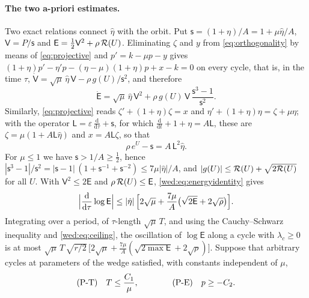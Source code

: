 \paragraph{The two a-priori estimates.}
Two exact relations connect $\hat\eta$ with the orbit. Put $\mathsf s=(1+\eta)/A=1+\mu\hat\eta/A$, $\mathsf V=P/\mathsf s$ and $\mathsf E=\tfrac12\mathsf V^2+\rho\,\mathcal R(U)$. Eliminating $\zeta$ and $y$ from \eqref{eq:orthogonality} by means of \eqref{eq:projective} and $p'=k-\mu p-y$ gives $(1+\eta)p'-\eta'p-(\eta-\mu)(1+\eta)p+x-k=0$ on every cycle, that is, in the time $\tau$, $\dot{\mathsf V}=\sqrt\mu\,\hat\eta\,\mathsf V-\rho\,g(U)/\mathsf s^2$, and therefore
\begin{equation}\label{wed:eq:energyidentity}
\dot{\mathsf E}=\sqrt\mu\,\hat\eta\,\mathsf V^2+\rho\,g(U)\,\mathsf V\,\frac{\mathsf s^3-1}{\mathsf s^2}.
\end{equation}
Similarly, \eqref{eq:projective} reads $\zeta'+(1+\eta)\zeta=x$ and $\eta'+(1+\eta)\eta=\zeta+\mu\eta$; with the operator $\mathsf L=\varepsilon\,\tfrac{\mathrm d}{\mathrm d\tau}+\mathsf s$, for which $\tfrac{\mathrm d}{\mathrm dt}+1+\eta=A\mathsf L$, these are $\zeta=\mu(1+A\mathsf L\hat\eta)$ and $x=A\mathsf L\zeta$, so that
\begin{equation}\label{wed:eq:spike}
\rho\,e^U-\mathsf s=A\,\mathsf L^2\hat\eta .
\end{equation}
For $\mu\le1$ we have $\mathsf s>1/A\ge\tfrac12$, hence $|\mathsf s^3-1|/\mathsf s^2=|\mathsf s-1|\,(1+\mathsf s^{-1}+\mathsf s^{-2})\le7\mu|\hat\eta|/A$, and $|g(U)|\le\mathcal R(U)+\sqrt{2\mathcal R(U)}$ for all $U$. With $\mathsf V^2\le2\mathsf E$ and $\rho\,\mathcal R(U)\le\mathsf E$, \eqref{wed:eq:energyidentity} gives
\begin{equation}\label{wed:eq:logenergy}
\Bigl|\frac{\mathrm d}{\mathrm d\tau}\log\mathsf E\Bigr|\le|\hat\eta|\,\Bigl[2\sqrt\mu+\frac{7\mu}{A}\bigl(\sqrt{2\mathsf E}+2\sqrt\rho\bigr)\Bigr].
\end{equation}
Integrating over a period, of $\tau$-length $\sqrt\mu\,T$, and using the Cauchy--Schwarz inequality and \eqref{wed:eq:ceiling}, the oscillation of $\log\mathsf E$ along a cycle with $\lambda_c\ge0$ is at most $\sqrt\mu\,T\,\sqrt{r/2}\,\bigl[2\sqrt\mu+\tfrac{7\mu}{A}(\sqrt{2\max\mathsf E}+2\sqrt\rho)\bigr]$. Suppose that arbitrary cycles at parameters of the wedge satisfied, with constants independent of $\mu$,
\begin{equation}\label{wed:eq:apriori}
\textup{(P-T)}\quad T\le\frac{C_1}{\mu},\qquad\qquad \textup{(P-E)}\quad p\ge-C_2 .
\end{equation}
